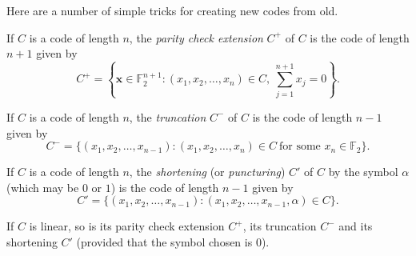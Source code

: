 Here are a number of simple tricks for creating new
codes from old.
\begin{definition} If $C$ is a code of
length $n$, the \emph{parity check extension}
$C^{+}$ of $C$ is the code of length $n+1$ given by
\[C^{+}=\left\{{\mathbf x}\in{\mathbb F}_{2}^{n+1}:
(x_{1},x_{2},\dots,x_{n})\in C,\ \sum_{j=1}^{n+1}x_{j}=0
\right\}.\]
\end{definition}
\begin{definition} If $C$ is a code of
length $n$, the \emph{truncation}
$C^{-}$ of $C$ is the code of length $n-1$ given by
\[C^{-}=\{(x_{1},x_{2},\dots,x_{n-1}):
(x_{1},x_{2},\dots,x_{n})\in C
\ \text{for some $x_{n}\in{\mathbb F}_{2}$}\}.\]
\end{definition}
\begin{definition} If $C$ is a code of
length $n$, the \emph{shortening} (or \emph{puncturing})
$C'$ of $C$ by the symbol $\alpha$ (which may be $0$
or $1$)
is the code of length $n-1$ given by
\[C'=\{(x_{1},x_{2},\dots,x_{n-1}):
(x_{1},x_{2},\dots,x_{n-1},\alpha)\in C\}.\]
\end{definition}
\begin{lemma} If $C$ is linear, so is its
parity check extension $C^{+}$, its
truncation $C^{-}$ and its shortening $C'$ (provided
that the symbol chosen is $0$).
\end{lemma}

